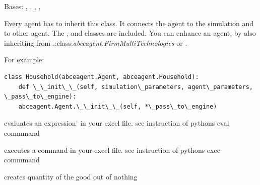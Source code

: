 \documentclass[letterpaper,10pt,english]{sphinxmanual}
\begin{document}
\begin{fulllineitems}
\label{Agent_class:abce.Agent}
Bases: , , , , 

Every agent has to inherit this class. It connects the agent to the simulation
and to other agent. The ,  and
 classes are included. You can enhance an agent, by also
inheriting from .:class:\emph{abceagent.FirmMultiTechnologies}
or .

For example:

\begin{Verbatim}[commandchars=\\\{\}]
class Household(abceagent.Agent, abceagent.Household):
    def \_\_init\_\_(self, simulation\_parameters, agent\_parameters, \_pass\_to\_engine):
    abceagent.Agent.\_\_init\_\_(self, *\_pass\_to\_engine)
\end{Verbatim}

\begin{fulllineitems}
\label{Agent_class:abce.Agent.aesof_eval}
evaluates an expression' in your excel file. see instruction of pythons eval commmand

\end{fulllineitems}


\begin{fulllineitems}
\label{Agent_class:abce.Agent.aesof_exec}
executes a command in your excel file. see instruction of pythons exec commmand

\end{fulllineitems}


\begin{fulllineitems}
\label{Agent_class:abce.Agent.create}
creates quantity of the good out of nothing


\end{fulllineitems}
\end{fulllineitems}
\end{document}
